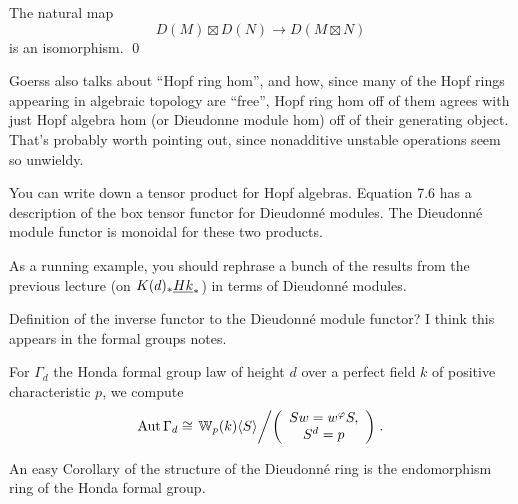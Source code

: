 \begin{theorem}
The natural map \[D(M) \boxtimes D(N) \to D(M \boxtimes N)\] is an isomorphism. \qed
\end{theorem}

Goerss also talks about ``Hopf ring hom'', and how, since many of the Hopf rings appearing in algebraic topology are ``free'', Hopf ring hom off of them agrees with just Hopf algebra hom (or Dieudonne module hom) off of their generating object.  That's probably worth pointing out, since nonadditive unstable operations seem so unwieldy.


You can write down a tensor product for Hopf algebras.  Equation 7.6 has a description of the box tensor functor for Dieudonn\'e modules.  The Dieudonn\'e module functor is monoidal for these two products.


As a running example, you should rephrase a bunch of the results from the previous lecture (on $K(d)_* \underline{\smash{Hk}}_{*}$) in terms of Dieudonn\'e modules.

\begin{remark}
\end{remark}


Definition of the inverse functor to the Dieudonn\'e module functor?  I think this appears in the formal groups notes.


\begin{corollary}\label{FormOfStabilizerGroup}
For $\Gamma_d$ the Honda formal group law of height $d$ over a perfect field $k$ of positive characteristic $p$, we compute \[\operatorname{Aut} \Gamma_d \cong \left. \mathbb W_p(k) \langle S\rangle \middle/ \left( \begin{array}{c} Sw = w^\varphi S, \\ S^d = p \end{array} \right) \right..\]
\end{corollary}
An easy Corollary of the structure of the Dieudonn\'e ring is the endomorphism ring of the Honda formal group.


